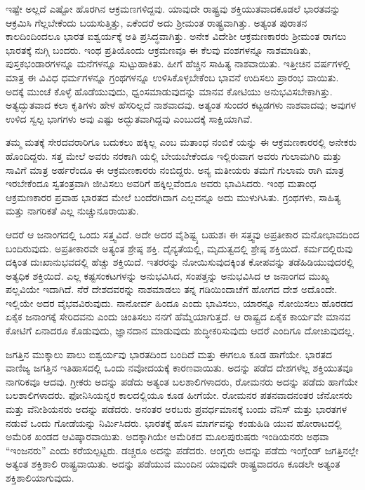 ಇಷ್ಟೇ ಅಲ್ಲದೆ ಎಷ್ಟೋ ಹೊರಗಿನ ಆಕ್ರಮಣಗಳಿದ್ದವು. ಯಾವುದೇ ರಾಷ್ಟ್ರವು ಶಕ್ತಿಯುತವಾದಕೂಡಲೆ ಭಾರತವನ್ನು ಆಕ್ರಮಿಸಿ ಗೆಲ್ಲಬೇಕೆಂದು ಬಯಸುತ್ತಿತ್ತು, ಏಕೆಂದರೆ ಅದು ಶ‍್ರೀಮಂತ ರಾಷ್ಟ್ರವಾಗಿತ್ತು. ಅತ್ಯಂತ ಪುರಾತನ ಕಾಲದಿಂದಿಂದಲೂ ಭಾರತ ಐಶ್ವರ್ಯಕ್ಕೆ ಅತಿ ಪ್ರಸಿದ್ಧವಾಗಿತ್ತು. ಅನೇಕ ವಿದೇಶೀ ಆಕ್ರಮಣಕಾರರು ಶ‍್ರೀಮಂತ ರಾಗಲು ಭಾರತಕ್ಕೆ ನುಗ್ಗಿ ಬಂದರು. ಇಂಥ ಪ್ರತಿಯೊಂದು ಆಕ್ರಮಣವೂ ಈ ಕೆಲವು ವಂಶಗಳನ್ನೂ ನಾಶಮಾಡಿತು, ಪುಸ್ತಕಭಂಡಾರಗಳನ್ನೂ ಮನೆಗಳನ್ನೂ ಸುಟ್ಟುಹಾಕಿತು. ಹೀಗೆ ಹೆಚ್ಚಿನ ಸಾಹಿತ್ಯ ನಾಶವಾಯಿತು. ಇತ್ತೀಚಿನ ವರ್ಷಗಳಲ್ಲಿ ಮಾತ್ರ ಈ ವಿವಿಧ ಧರ್ಮಗಳನ್ನೂ ಗ್ರಂಥಗಳನ್ನೂ ಉಳಿಸಿಕೊಳ್ಳಬೇಕೆಂಬ ಭಾವನೆ ಉದಿಸಲು ಪ್ರಾರಂಭ ವಾಯಿತು. ಅದಕ್ಕೆ ಮುಂಚೆ ಕೊಳ್ಳೆ ಹೊಡೆಯುವುದು, ಧ್ವಂಸಮಾಡುವುದನ್ನು ಮಾನವ ಕೋಟಿಯು ಅನುಭವಿಸಬೇಕಾಗಿತ್ತು. ಅತ್ಯದ್ಭುತವಾದ ಕಲಾ ಕೃತಿಗಳು ಹೇಳ ಹೆಸರಿಲ್ಲದೆ ನಾಶವಾದವು. ಅತ್ಯಂತ ಸುಂದರ ಕಟ್ಟಡಗಳು ನಾಶವಾದವು; ಅವುಗಳ ಉಳಿದ ಸ್ವಲ್ಪ ಭಾಗಗಳು ಅವು ಎಷ್ಟು ಅದ್ಭುತವಾಗಿದ್ದವು ಎಂಬುದಕ್ಕೆ ಸಾಕ್ಷಿಯಾಗಿವೆ.

ತಮ್ಮ ಮತಕ್ಕೆ ಸೇರದವರಾರಿಗೂ ಬದುಕಲು ಹಕ್ಕಿಲ್ಲ ಎಂಬ ಮತಾಂಧ ನಂಬಿಕೆ ಯನ್ನು ಈ ಆಕ್ರಮಣಕಾರರಲ್ಲಿ ಅನೇಕರು ಹೊಂದಿದ್ದರು. ಸತ್ತ ಮೇಲೆ ಅವರು ನರಕಾಗಿ ಯಲ್ಲಿ ಬೇಯಬೇಕೆಂದೂ ಇಲ್ಲಿರುವಾಗ ಅವರು ಗುಲಾಮಗಿರಿ ಮತ್ತು ಸಾವಿಗೆ ಮಾತ್ರ ಅರ್ಹರೆಂದೂ ಈ ಆಕ್ರಮಣಕಾರರು ನಂಬಿದ್ದರು. ಅನ್ಯ ಮತೀಯರು ತಮಗೆ ಗುಲಾಮ ರಾಗಿ ಮಾತ್ರ ಇರಬೇಕೆಂದೂ ಸ್ವತಂತ್ರವಾಗಿ ಜೀವಿಸಲು ಅವರಿಗೆ ಹಕ್ಕಿಲ್ಲವೆಂದೂ ಅವರು ಭಾವಿಸಿದರು. ಇಂಥ ಮತಾಂಧ ಆಕ್ರಮಣಕಾರರ ಪ್ರವಾಹ ಭಾರತದ ಮೇಲೆ ಬಂದೆರಗಿದಾಗ ಎಲ್ಲವನ್ನೂ ಅದು ಮುಳುಗಿಸಿತು. ಗ್ರಂಥಗಳು, ಸಾಹಿತ್ಯ ಮತ್ತು ನಾಗರಿಕತೆ ಎಲ್ಲ ನುಚ್ಚುನೂರಾಯಿತು.

ಆದರೆ ಆ ಜನಾಂಗದಲ್ಲಿ ಒಂದು ಸತ್ತ್ವವಿದೆ. ಅದೇ ಅದರ ವೈಶಿಷ್ಟ್ಯ ಬಹುಶಃ ಈ ಸತ್ತ್ವವು ಅಪ್ರತೀಕಾರ ಮನೋಭಾವದಿಂದ ಬಂದಿರುವುದು. ಅಪ್ರತೀಕಾರವೇ ಅತ್ಯಂತ ಶ್ರೇಷ್ಠ ಶಕ್ತಿ. ದೈನ್ಯತೆಯಲ್ಲಿ, ಮೃದುತ್ವದಲ್ಲಿ ಶ್ರೇಷ್ಠ ಶಕ್ತಿಯಿದೆ. ಕರ್ಮದಲ್ಲಿರುವು ದಕ್ಕಿಂತ ದುಃಖಾನುಭವದಲ್ಲಿ ಹೆಚ್ಚು ಶಕ್ತಿಯಿದೆ. ಇತರರನ್ನು ನೋಯಿಸುವುದಕ್ಕಿಂತ ಕೋಪವನ್ನು ತಡೆಹಿಡಿಯುವುದರಲ್ಲಿ ಅತ್ಯಧಿಕ ಶಕ್ತಿಯಿದೆ. ಎಲ್ಲ ಕಷ್ಟಸಂಕಟಗಳನ್ನು ಅನುಭವಿಸಿದ, ಸಂಪತ್ತನ್ನು ಅನುಭವಿಸಿದ ಆ ಜನಾಂಗದ ಮುಖ್ಯ ಪಲ್ಲವಿಯೇ ಇದಾಗಿದೆ. ನೆರೆ ದೇಶದವರನ್ನು ನಾಶಮಾಡಲು ತನ್ನ ಗಡಿಯಿಂದಾಚೆಗೆ ಹೋಗದ ದೇಶ ಅದೊಂದೇ. ಇಲ್ಲಿಯೇ ಅದರ ವೈಭವವಿರುವುದು. ನಾನೋರ್ವ ಹಿಂದೂ ಎಂದು ಭಾವಿಸಲು, ಯಾರನ್ನೂ ನೋಯಿಸಲು ಹೊರಡದ ಏಕೈಕ ಜನಾಂಗಕ್ಕೆ ಸೇರಿದವನು ಎಂದು ಚಿಂತಿಸಲು ನನಗೆ ಹೆಮ್ಮೆಯಾಗುತ್ತದೆ. ಆ ರಾಷ್ಟ್ರದ ಏಕೈಕ ಕಾರ್ಯವೇ ಮಾನವ ಕೋಟಿಗೆ ಏನಾದರೂ ಕೊಡುವುದು, ಜ್ಞಾನದಾನ ಮಾಡುವುದು ಶುದ್ಧೀಕರಿಸುವುದು ಆದರೆ ಎಂದಿಗೂ ದೋಚುವುದಲ್ಲ.

ಜಗತ್ತಿನ ಮುಕ್ಕಾಲು ಪಾಲು ಐಶ್ವರ್ಯವು ಭಾರತದಿಂದ ಬಂದಿದೆ ಮತ್ತು ಈಗಲೂ ಕೂಡ ಹಾಗೆಯೇ. ಭಾರತದ ವಾಣಿಜ್ಯ ಜಗತ್ತಿನ ಇತಿಹಾಸದಲ್ಲಿ ಒಂದು ನವೋದಯಕ್ಕೆ ಕಾರಣವಾಯಿತು. ಅದನ್ನು ಪಡೆದ ದೇಶಗಳೆಲ್ಲ ಶಕ್ತಿಯುತವೂ ನಾಗರಿಕವೂ ಆದವು. ಗ್ರೀಕರು ಅದನ್ನು ಪಡೆದು ಅತ್ಯಂತ ಬಲಶಾಲಿಗಳಾದರು, ರೋಮನರು ಅದನ್ನು ಪಡೆದು ಹಾಗೆಯೇ ಬಲಶಾಲಿಗಳಾದರು. ಫೋನಿಸಿಯನ್ನರ ಕಾಲದಲ್ಲಿಯೂ ಕೂಡ ಹೀಗೆಯೇ. ರೋಮನರ ಪತನವಾದನಂತರ ಜೆನೋಸರು ಮತ್ತು ವೆನೀಶಿಯನರು ಅದನ್ನು ಪಡೆದರು. ಅನಂತರ ಅರಬರು ಪ್ರವರ್ಧಮಾನಕ್ಕೆ ಬಂದು ವೆನಿಸ್ ಮತ್ತು ಭಾರತಗಳ ನಡುವೆ ಒಂದು ಗೋಡೆಯನ್ನು ನಿರ್ಮಿಸಿದರು. ಭಾರತಕ್ಕೆ ಹೊಸ ಮಾರ್ಗವನ್ನು ಕಂಡುಹಿಡಿ ಯುವ ಹೋರಾಟದಲ್ಲಿ ಅಮೆರಿಕ ಖಂಡದ ಆವಿಷ್ಕಾರವಾಯಿತು. ಅದಕ್ಕಾಗಿಯೇ ಅಮೆರಿಕದ ಮೂಲಪುರುಷರು ಇಂಡಿಯನರು ಅಥವಾ “ಇಂಜನರು” ಎಂದು ಕರೆಯಲ್ಪಟ್ಟರು. ಡಚ್ಚರೂ ಅದನ್ನು ಪಡೆದರು. ಆಂಗ್ಲರು ಅದನ್ನು ಪಡೆದು ಇಂಗ್ಲೆಂಡ್ ಜಗತ್ತಿನಲ್ಲೇ ಅತ್ಯಂತ ಶಕ್ತಿಶಾಲಿ ರಾಷ್ಟ್ರವಾಯಿತು. ಅದನ್ನು ಪಡೆಯುವ ಮುಂದಿನ ಯಾವುದೇ ರಾಷ್ಟ್ರವಾದರೂ ಕೂಡಲೇ ಅತ್ಯಂತ ಶಕ್ತಿಶಾಲಿಯಾಗುವುದು.

